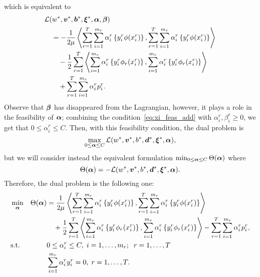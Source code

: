 which is equivalent to 
\begin{equation}
    \nonumber
    \begin{aligned}
        &  \mathcal{L}({{w}}^*, {\bm{v}}^*, {\bm{b}}^*, {\bm{\xi}}^*, \bm{\alpha}, \bm{\beta}) \\
        &\quad = - \frac{1}{2\mu} \bm{\left\langle}  \sum_{r= 1}^T \sum_{i=1}^{m_r} {\alpha_i^r} \left\lbrace y_i^r \phi({x}_i^r) \right\rbrace,  \sum_{r= 1}^T \sum_{i=1}^{m_r} {\alpha_i^r} \left\lbrace y_i^r \phi({x}_i^r) \right\rbrace \bm{\right\rangle} \\
        &\qquad - \frac{1}{2} \sum_{r= 1}^T {\bm{\left\langle} \sum_{i=1}^{m_r} {\alpha_i^r} \left\lbrace y_i^r \phi_r({x}_i^r) \right\rbrace, \sum_{i=1}^{m_r} {\alpha_i^r} \left\lbrace y_i^r \phi_r({x}_i^r) \right\rbrace \bm{\right\rangle}} \\
        &\qquad +  \sum_{r= 1}^T \sum_{i=1}^{m_r} \alpha_i^r  p_{i}^r .
    \end{aligned}
\end{equation}
Observe that $\bm{\beta}$ has disappeared from the Lagrangian, however, it plays a role in the feasibility of $\bm{\alpha}$; combining the condition~\eqref{eq:xi_feas_add} with $\alpha_i^r , \beta_i^r \geq 0$, we get that $0 \leq \alpha_i^r \leq C$.
Then, with this feasibility condition, the dual problem is 
$$ \max_{0 \leq \bm{\alpha} \leq C} \mathcal{L}({{w}}^*, {\bm{v}}^*, {b}^*, {\bm{d}}^*, {\bm{\xi}}^*, \bm{\alpha}),$$
but we will consider instead the equivalent formulation
$\min_{0 \leq \bm{\alpha} \leq C} \Theta(\bm{\alpha})$ where 
$$ \Theta(\bm{\alpha}) = - \mathcal{L}({{w}}^*, {\bm{v}}^*, {b}^*, {\bm{d}}^*, {\bm{\xi}}^*, \bm{\alpha}). $$
Therefore, the dual problem is the following one:
\begin{equation}\label{eq:svmmtl_dual_add}
    \begin{aligned}
    & \min_{\fv{\alpha}} & \Theta(\fv{\alpha}) &=  \frac{1}{2\mu} \dotp{ \sum_{r= 1}^T \sum_{i=1}^{m_r} {\alpha_i^r} \left\lbrace y_i^r \phi({x}_i^r) \right\rbrace}{ \sum_{r= 1}^T \sum_{i=1}^{m_r} {\alpha_i^r} \left\lbrace y_i^r \phi({x}_i^r) \right\rbrace} \\
    & & &\quad + \frac{1}{2} \sum_{r= 1}^T {\dotp{\sum_{i=1}^{m_r} {\alpha_i^r} \left\lbrace y_i^r \phi_r({x}_i^r) \right\rbrace}{\sum_{i=1}^{m_r} {\alpha_i^r} \left\lbrace y_i^r \phi_r({x}_i^r) \right\rbrace}}  - \sum_{r=1}^\ntasks \sum_{i=1}^{\npertask_r} \alpha_i^r p_i^r ,\\
    & \text{s.t.}
    & & 0 \leq \alpha_i^r \leq C , \; i=1, \ldots, \npertask_r;\;\; r=1, \ldots, \ntasks \\
    & & & \sum_{i=1}^{m_r} \alpha_i^r y_i^r = 0,\;  r=1, \ldots, \ntasks . \\
    \end{aligned}
\end{equation}

